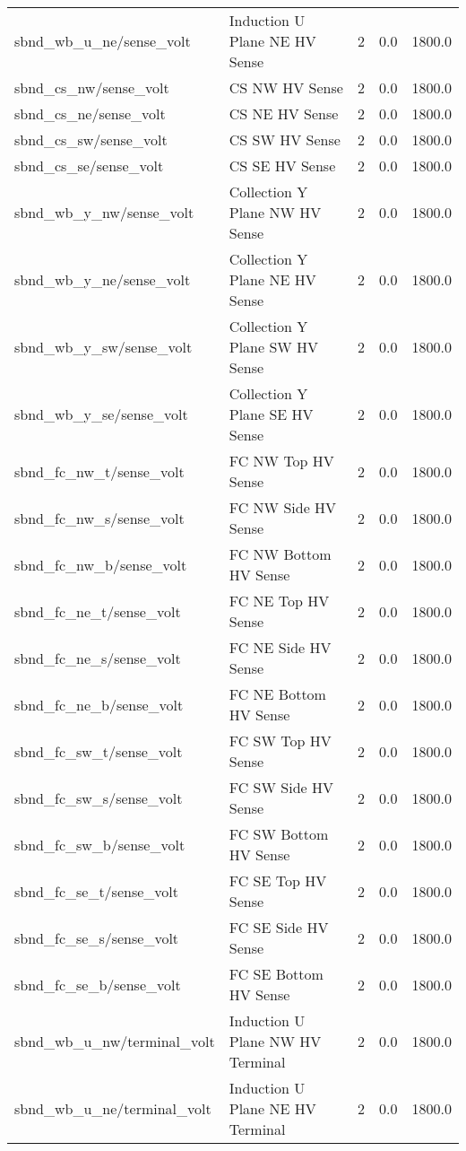 \begin{center}
\begin{longtable}{l | l l l l }
sbnd\_wb\_u\_ne/sense\_volt & Induction U Plane NE HV Sense & 2 & 0.0 & 1800.0\\ 
sbnd\_cs\_nw/sense\_volt & CS NW HV Sense & 2 & 0.0 & 1800.0\\ 
sbnd\_cs\_ne/sense\_volt & CS NE HV Sense & 2 & 0.0 & 1800.0\\ 
sbnd\_cs\_sw/sense\_volt & CS SW HV Sense & 2 & 0.0 & 1800.0\\ 
sbnd\_cs\_se/sense\_volt & CS SE HV Sense & 2 & 0.0 & 1800.0\\ 
sbnd\_wb\_y\_nw/sense\_volt & Collection Y Plane NW HV Sense & 2 & 0.0 & 1800.0\\ 
sbnd\_wb\_y\_ne/sense\_volt & Collection Y Plane NE HV Sense & 2 & 0.0 & 1800.0\\ 
sbnd\_wb\_y\_sw/sense\_volt & Collection Y Plane SW HV Sense & 2 & 0.0 & 1800.0\\ 
sbnd\_wb\_y\_se/sense\_volt & Collection Y Plane SE HV Sense & 2 & 0.0 & 1800.0\\ 
sbnd\_fc\_nw\_t/sense\_volt & FC NW Top HV Sense & 2 & 0.0 & 1800.0\\ 
sbnd\_fc\_nw\_s/sense\_volt & FC NW Side HV Sense & 2 & 0.0 & 1800.0\\ 
sbnd\_fc\_nw\_b/sense\_volt & FC NW Bottom HV Sense & 2 & 0.0 & 1800.0\\ 
sbnd\_fc\_ne\_t/sense\_volt & FC NE Top HV Sense & 2 & 0.0 & 1800.0\\ 
sbnd\_fc\_ne\_s/sense\_volt & FC NE Side HV Sense & 2 & 0.0 & 1800.0\\ 
sbnd\_fc\_ne\_b/sense\_volt & FC NE Bottom HV Sense & 2 & 0.0 & 1800.0\\ 
sbnd\_fc\_sw\_t/sense\_volt & FC SW Top HV Sense & 2 & 0.0 & 1800.0\\ 
sbnd\_fc\_sw\_s/sense\_volt & FC SW Side HV Sense & 2 & 0.0 & 1800.0\\ 
sbnd\_fc\_sw\_b/sense\_volt & FC SW Bottom HV Sense & 2 & 0.0 & 1800.0\\ 
sbnd\_fc\_se\_t/sense\_volt & FC SE Top HV Sense & 2 & 0.0 & 1800.0\\ 
sbnd\_fc\_se\_s/sense\_volt & FC SE Side HV Sense & 2 & 0.0 & 1800.0\\ 
sbnd\_fc\_se\_b/sense\_volt & FC SE Bottom HV Sense & 2 & 0.0 & 1800.0\\ 
sbnd\_wb\_u\_nw/terminal\_volt & Induction U Plane NW HV Terminal & 2 & 0.0 & 1800.0\\ 
sbnd\_wb\_u\_ne/terminal\_volt & Induction U Plane NE HV Terminal & 2 & 0.0 & 1800.0\\ 

\end{longtable}
\end{center}
